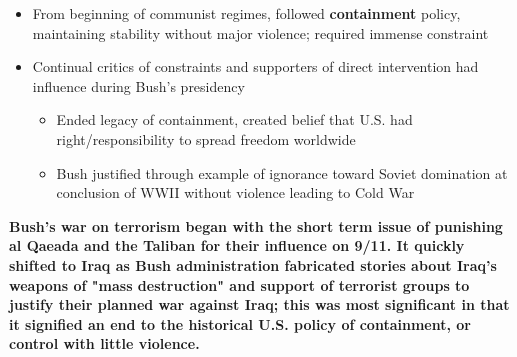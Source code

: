 \documentclass[a4paper]{article}
\begin{document}
{\begin{itemize}
\begin{itemize}
            \begin{itemize}
                \item From beginning of communist regimes, followed \textbf{containment} policy, maintaining stability without major violence; required immense constraint
                \item Continual critics of constraints and supporters of direct intervention had influence during Bush's presidency
                \begin{itemize}
                    \item Ended legacy of containment, created belief that U.S. had right/responsibility to spread freedom worldwide
                    \item Bush justified through example of ignorance toward Soviet domination at conclusion of WWII without violence leading to Cold War
                \end{itemize}
            \end{itemize}
        \end{itemize}
    \end{itemize}
    \textbf{Bush's war on terrorism began with the short term issue of punishing al Qaeada and the Taliban for their influence on 9/11. It quickly shifted to Iraq as Bush administration fabricated stories about Iraq's weapons of "mass destruction" and support of terrorist groups to justify their planned war against Iraq; this was most significant in that it signified an end to the historical U.S. policy of containment, or control with little violence.}
}
\end{document}
